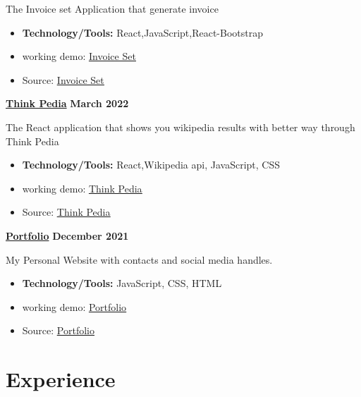 \documentclass[letterpaper, 11pt]{article}
\newcommand{\bulletSpace}{\vspace{-8pt}}
\newcommand{\secStartSpace}{\vspace{3pt}}
\newcommand{\secEndSpace}{\vspace{5pt}}
\newcommand{\spaceCollapse}{\vspace{-5pt}}
\begin{document}
\begin{addmargin}[1em]{1em}
	\noindent The Invoice set Application that generate invoice
	\spaceCollapse
	\begin{itemize}
		\item \textbf{Technology/Tools:} React,JavaScript,React-Bootstrap
		      \bulletSpace
            	\item working demo:  \href{https://invoiceset.netlify.app/}
  {\underline{Invoice Set}}
		\item Source:  \href{https://github.com/sukhlotey/invoice-set}
  {\underline{Invoice Set}}
	\end{itemize}
	
 \newpage
	\noindent\href{https://github.com/sukhlotey/think-pedia}{\textbf{Think Pedia}}  \hfill \textbf{March 2022} 
		
	\noindent The React application that shows you wikipedia results with better way through Think Pedia
	\spaceCollapse
	\begin{itemize}
		\item \textbf{Technology/Tools:} React,Wikipedia api, JavaScript, CSS
		      \bulletSpace
		\item working demo:  \href{https://thinkpedia.netlify.app/}{\underline{Think Pedia}}
           \item Source:  \href{https://github.com/sukhlotey/think-pedia}{\underline{Think Pedia}}
	\end{itemize}
	\noindent\href{https://github.com/sukhlotey/imSukhpreet}{\textbf{Portfolio}}  \hfill \textbf{December 2021} 
		
	\noindent My Personal Website with contacts and social media handles.
	\spaceCollapse
	\begin{itemize}
		\item \textbf{Technology/Tools:} JavaScript, CSS, HTML
		      \bulletSpace
		\item working demo:  \href{https://sukhlotey.github.io/imSukhpreet/}{\underline{Portfolio}}
           \item Source:  \href{https://github.com/sukhlotey/imSukhpreet}{\underline{Portfolio}}
	\end{itemize}
		
\end{addmargin}
\secEndSpace
\section{\color{blue} \textbf{Experience}}
\secStartSpace
\end{document}

